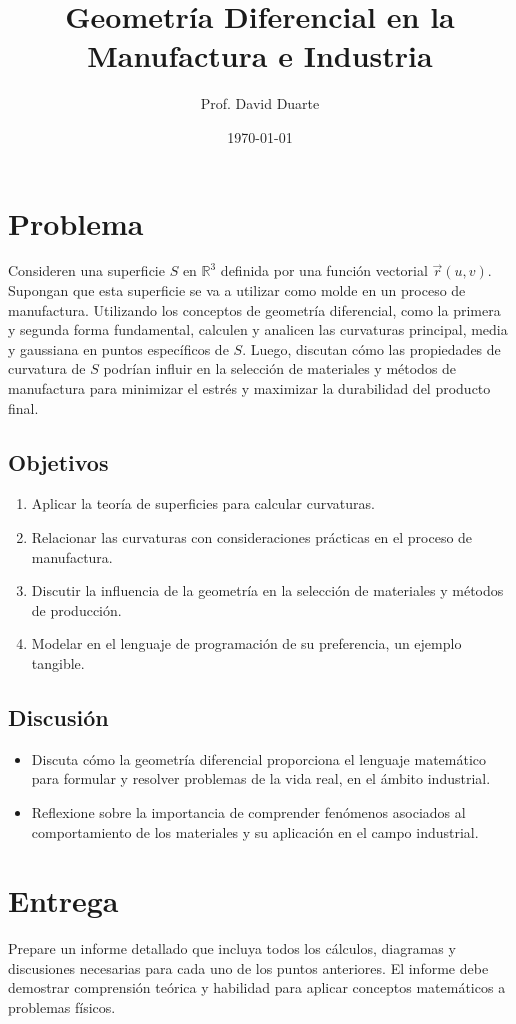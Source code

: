 \documentclass{article}
\begin{document}
	
	\title{ Geometría Diferencial en la Manufactura e Industria}
	\author{Prof. David Duarte}
	\date{\today}
	
	\maketitle
	
	\section*{Problema}
	
	Consideren una superficie \( S \) en \( \mathbb{R}^3 \) definida por una función vectorial \( \vec{r}(u, v) \). Supongan que esta superficie se va a utilizar como molde en un proceso de manufactura. Utilizando los conceptos de geometría diferencial, como la primera y segunda forma fundamental, calculen y analicen las curvaturas principal, media y gaussiana en puntos específicos de \( S \). Luego, discutan cómo las propiedades de curvatura de \( S \) podrían influir en la selección de materiales y métodos de manufactura para minimizar el estrés y maximizar la durabilidad del producto final.
	
	\subsection*{Objetivos}
	
	\begin{enumerate}
		\item Aplicar la teoría de superficies para calcular curvaturas.
		\item Relacionar las curvaturas con consideraciones prácticas en el proceso de manufactura.
		\item Discutir la influencia de la geometría en la selección de materiales y métodos de producción.
		\item Modelar en el lenguaje de programación de su preferencia, un ejemplo tangible.
	\end{enumerate}
	
	\subsection*{Discusión}
	\begin{itemize}
		\item Discuta cómo la geometría diferencial proporciona el lenguaje matemático para formular y resolver problemas de la vida real, en el ámbito industrial.
		\item Reflexione sobre la importancia de comprender fenómenos asociados al comportamiento de los materiales y su aplicación en el campo industrial.
	\end{itemize}
	
		\section*{Entrega}
	Prepare un informe detallado que incluya todos los cálculos, diagramas y discusiones necesarias para cada uno de los puntos anteriores. El informe debe demostrar comprensión teórica y habilidad para aplicar conceptos matemáticos a problemas físicos.
	
\end{document}
